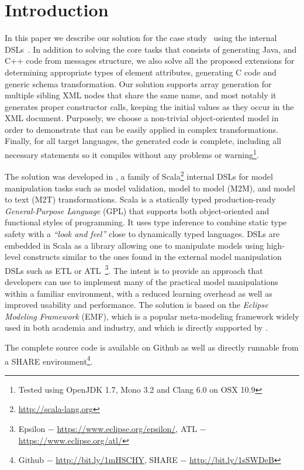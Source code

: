 

\section{Introduction}
\label{sec:Introduction}

In this paper we describe our solution for the \TTC \FIXML case study~\cite{Lano2014} using the \SIGMA internal DSLs~\cite{Krikava2014}.
In addition to solving the core tasks that consists of generating Java, \Csharp and C++ code from \FIXML messages structure, we also solve all the proposed extensions for determining appropriate types of element attributes, generating C code and generic \FIXML schema transformation.
Our solution supports array generation for multiple sibling XML nodes that share the same name, and most notably it generates proper constructor calls, keeping the initial values as they occur in the XML document.
Purposely, we choose a non-trivial object-oriented model in order to demonstrate that \SIGMA can be easily applied in complex transformations.
Finally, for all target languages, the generated code is complete, including all necessary statements so it compiles without any problems or warning\footnote{Tested using OpenJDK 1.7, Mono 3.2 and Clang 6.0 on OSX 10.9}.

The solution was developed in \SIGMA, a family of Scala\footnote{\url{http://scala-lang.org}} internal DSLs for model manipulation tasks such as model validation, model to model (M2M), and model to text (M2T) transformations.
Scala is a statically typed production-ready \emph{General-Purpose Language} (GPL) that supports both object-oriented and functional styles of programming.
It uses type inference to combine static type safety with a \emph{``look and feel''} close to dynamically typed languages.
\SIGMA DSLs are embedded in Scala as a library allowing one to manipulate models using high-level constructs similar to the ones found in the external model manipulation DSLs such as ETL or ATL~\footnote{Epsilon $-$ \url{https://www.eclipse.org/epsilon/}, ATL $-$ \url{https://www.eclipse.org/atl/}}.
The intent is to provide an approach that developers can use to implement many of the practical model manipulations within a familiar environment, with a reduced learning overhead as well as improved usability and performance.
The solution is based on the \emph{Eclipse Modeling Framework} (EMF), which is a popular meta-modeling framework widely used in both academia and industry, and which is directly supported by \SIGMA.

The complete source code is available on Github as well as directly runnable from a SHARE environment\footnote{Github $-$ \url{http://bit.ly/1mHSCHY}, SHARE $-$ \url{http://bit.ly/1sSWDeB}}.